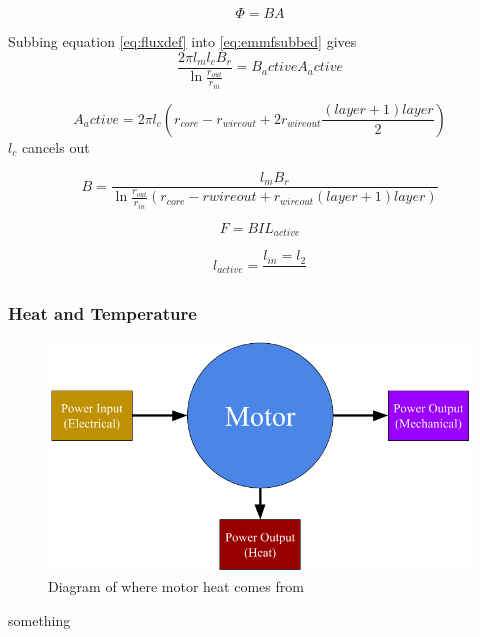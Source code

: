 \documentclass[a4paper,12pt]{article}
\begin{document}
\begin{equation}\label{eq:fluxdef}
\Phi = BA
\end{equation}

Subbing equation \ref{eq:fluxdef} into \ref{eq:emmfsubbed} gives
\begin{equation}\label{eq:fluxsubbed}
\frac{2\pi l_m l_c B_r}{\ln{\frac{r_{out}}{r_{in}}}} = B_active A_active
\end{equation}

\begin{equation}\label{eq:activearea}
A_active = 2\pi l_c (r_{core}-r_{wireout} + 2r_{wireout} \frac{(layer+1)layer}{2})
\end{equation}
$l_c$ cancels out

\begin{equation}\label{eq:fluxdensity}
B=\frac{l_m B_r}{\ln{\frac{r_{out}}{r_{in}}}(r_{core}-r{wireout}+r_{wireout}(layer+1)layer)}
\end{equation}

\begin{equation}\label{eq:fbil}
F=BIL_{active}
\end{equation}

\begin{equation}\label{eq:activel}
l_{active} = \frac{l_{in}=l_{2}}{}
\end{equation}

\subsubsection{Heat and Temperature}
\begin{figure}[h]
\centering
\includegraphics[scale=0.4]{motorheat.png}
\caption{Diagram of where motor heat comes from}
\end{figure}
something
\end{document}

